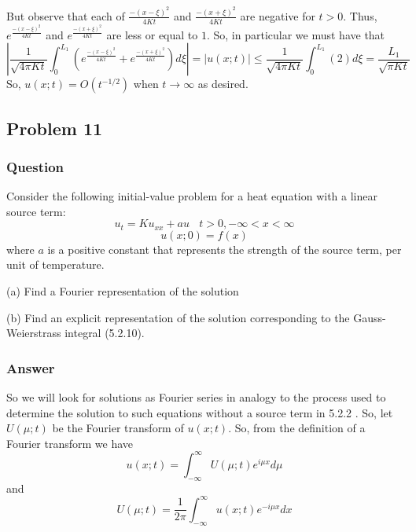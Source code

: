\documentclass[12pt]{article}
\begin{document}
But observe that each of ${\frac{-(x-\xi)^2}{4 K t}}$ and ${\frac{-(x+\xi)^2}{4 K t}}$ are negative for $t>0$. Thus, $e^{\frac{-(x-\xi)^2}{4 K t}}$ and $e^{\frac{-(x+\xi)^2}{4 K t}}$ are less or equal to $1$. So, in particular we must have that
\[ \left| \frac{1}{\sqrt{4\pi K t}}  \int_0^{L_1} \left( e^{\frac{-(x-\xi)^2}{4 K t}}+e^{\frac{-(x+\xi)^2}{4 K t}} \right)  d\xi \right| = |u(x;t)| \leq  \frac{1}{\sqrt{4\pi K t}}  \int_0^{L_1} \left(2\right)  d\xi  = \frac{L_1}{\sqrt{\pi K t}}\]
So, $u(x;t)=O(t^{-1/2})$ when $t\to\infty$ as desired.

\subsection{Problem 11}
\subsubsection{Question}

Consider the following initial-value problem for a heat equation with a linear source term:
\[u_t=K u_{xx} +au\ \ \ \ t>0,-\infty<x<\infty\]
\[u(x;0)=f(x)\]
where $a$ is a positive constant that represents the strength of the source term, per unit of temperature.

(a) Find a Fourier representation of the solution

(b) Find an explicit representation of the solution corresponding to the Gauss-Weierstrass integral (5.2.10).

\subsubsection{Answer}

So we will look for solutions as Fourier series in analogy to the process used to determine the solution to such equations without a source term in 5.2.2 \cite[Page 295]{pinsky}. So, let $U(\mu;t)$ be the Fourier transform of $u(x;t)$. So, from the definition of a Fourier transform we have 
\begin{equation}\label{reverse}u(x;t)=\int_{-\infty}^\infty U(\mu;t) e^{i \mu x}d\mu\end{equation}
and
\begin{equation}\label{forwards}U(\mu;t)=\frac{1}{2\pi}\int_{-\infty}^\infty u(x;t) e^{-i \mu x}dx\end{equation}
\end{document}
